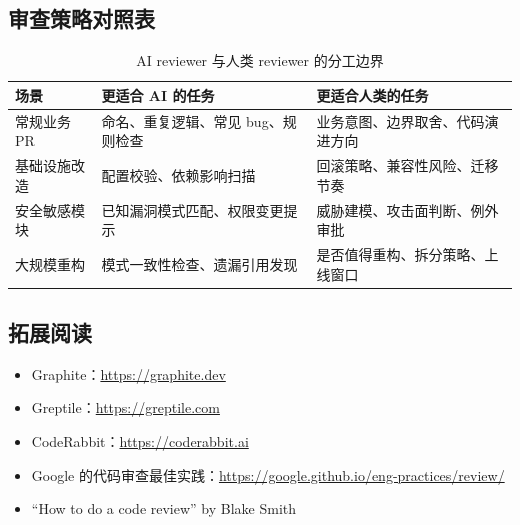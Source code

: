 \documentclass[a4paper]{article}
\begin{document}
\subsection{审查策略对照表}

\begin{table}[H]
\centering
\begin{tabular}{p{} p{} p{}}
\toprule
场景 & 更适合 AI 的任务 & 更适合人类的任务 \\
\midrule
常规业务 PR & 命名、重复逻辑、常见 bug、规则检查 & 业务意图、边界取舍、代码演进方向 \\
基础设施改造 & 配置校验、依赖影响扫描 & 回滚策略、兼容性风险、迁移节奏 \\
安全敏感模块 & 已知漏洞模式匹配、权限变更提示 & 威胁建模、攻击面判断、例外审批 \\
大规模重构 & 模式一致性检查、遗漏引用发现 & 是否值得重构、拆分策略、上线窗口 \\
\bottomrule
\end{tabular}
\caption{AI reviewer 与人类 reviewer 的分工边界}
\end{table}

\subsection{拓展阅读}

\begin{itemize}
    \item Graphite：\url{https://graphite.dev}
    \item Greptile：\url{https://greptile.com}
    \item CodeRabbit：\url{https://coderabbit.ai}
    \item Google 的代码审查最佳实践：\url{https://google.github.io/eng-practices/review/}
    \item ``How to do a code review'' by Blake Smith
\end{itemize}

\end{document}
